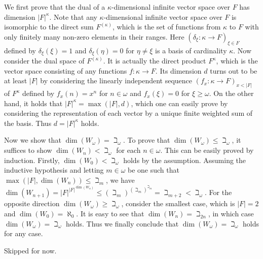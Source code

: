\documentclass[12pt]{article}
\theoremstyle{definition}
\newenvironment{customthm}[1]
  {\renewcommand\theinnercustomthm{#1}\innercustomthm}
  {\endinnercustomthm}
\begin{document}
\begin{customthm}{I.13.34}
  We first prove that the dual of a $\kappa$-dimensional infinite vector space over $F$ has dimension $|F|^\kappa$. Note that any $\kappa$-dimensional infinite vector space over $F$ is isomorphic to the direct sum $F^{(\kappa)}$, which is the set of functions from $\kappa$ to $F$ with only finitely many non-zero elements in their ranges. Here $(\delta_\xi:\kappa\rightarrow F)_{\xi\in F}$ defined by $\delta_\xi(\xi)=1$ and $\delta_\xi(\eta)=0$ for $\eta\neq\xi$ is a basis of cardinality $\kappa$. Now consider the dual space of $F^{(\kappa)}$. It is actually the direct product $F^\kappa$, which is the vector space consisting of any functions $f:\kappa\rightarrow F$. Its dimension $d$ turns out to be at least $|F|$ by considering the linearly independent sequence $(f_x:\kappa\rightarrow F)_{x<|F|}$ of $F^\kappa$ defined by $f_x(n)=x^n$ for $n\in\omega$ and $f_x(\xi)=0$ for $\xi\geq\omega$. On the other hand, it holds that $|F|^\kappa=\max(|F|,d)$, which one can easily prove by considering the representation of each vector by a unique finite weighted sum of the basis. Thus $d=|F|^\kappa$ holds.

  Now we show that $\dim(W_\omega)=\beth_\omega$. To prove that $\dim(W_\omega)\leq\beth_\omega$, it suffices to show $\dim(W_n)<\beth_\omega$ for each $n\in\omega$. This can be easily proved by induction. Firstly, $\dim(W_0)<\beth_\omega$ holds by the assumption. Assuming the inductive hypothesis and letting $m\in\omega$ be one such that $\max(|F|, \dim(W_n))\leq\beth_m$, we have $\dim(W_{n+1})=|F|^{|F|^{\dim(W_{n})}}\leq(\beth_m)^{(\beth_m)^{\beth_m}}=\beth_{m+2}<\beth_\omega$. For the opposite direction $\dim(W_\omega)\geq\beth_\omega$, consider the smallest case, which is $|F|=2$ and $\dim(W_0)=\aleph_0$. It is easy to see that $\dim(W_n)=\beth_{2n}$, in which case $\dim(W_\omega)=\beth_\omega$ holds. Thus we finally conclude that $\dim(W_\omega)=\beth_\omega$ holds for any case.
\end{customthm}

\begin{customthm}{I.13.35}
  Skipped for now.
\end{customthm}
\end{document}
